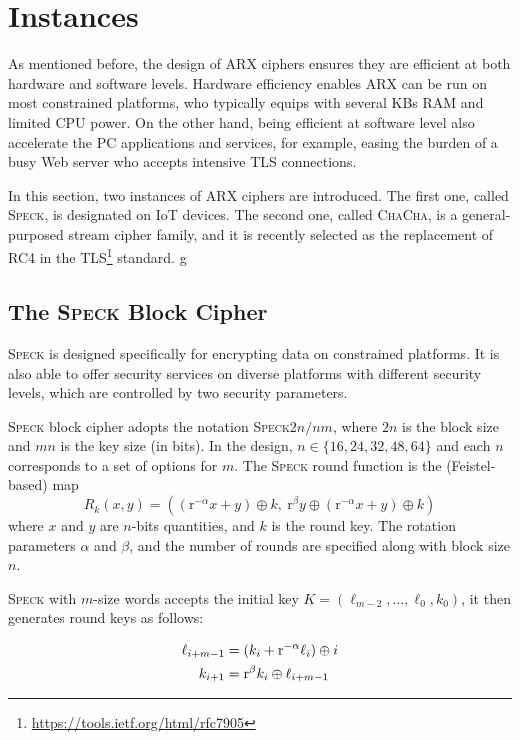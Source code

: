 \section{Instances}
\label{sec:instances}

As mentioned before, the design of ARX ciphers ensures they are efficient at both
hardware and software levels. Hardware efficiency enables ARX can be run on most
constrained platforms, who typically equips with several KBs RAM and limited CPU power.
On the other hand, being efficient at software level also accelerate the PC applications
and services, for example, easing the burden of a busy Web server who accepts intensive
TLS connections.

In this section, two instances of ARX ciphers are introduced. The first one, called
\textsc{Speck}\cite{beaulieu2015simon2}, is designated on IoT devices. The second one,
called \textsc{ChaCha}\cite{bernstein2008chacha}, is a general-purposed stream cipher
family, and it is recently selected as the replacement of RC4 in the
TLS\footnote{\url{https://tools.ietf.org/html/rfc7905}} standard.
g
\subsection{The \textsc{\textbf{Speck}} Block Cipher}

\textsc{Speck} is designed specifically for encrypting data on constrained platforms.
It is also able to offer security services on diverse platforms with different security
levels, which are controlled by two security parameters.

\textsc{Speck} block cipher adopts the notation \textsc{Speck}$2n/nm$, where $2n$ is the
block size and $mn$ is the key size (in bits). In the design, $n\in\{16,24,32,48,64\}$
and each $n$ corresponds to a set of options for $m$. The \textsc{Speck} round function
is the (Feistel-based) map
$$R_k(x,y)=((\mathrm{r}^{-\alpha}x+y)\oplus k,\ \mathrm{r}^\beta y\oplus(\mathrm{r}^{-\alpha}x+y)\oplus k)$$
where $x$ and $y$ are $n$-bits quantities, and $k$ is the round key. The rotation
parameters $\alpha$ and $\beta$, and the number of rounds are specified along with
block size $n$.

\textsc{Speck} with $m$-size words accepts the initial key $K=(\ell_{m-2},\dots,\ell_0,k_0)$,
it then generates round keys as follows:

\begin{equation*}
\setlength{\abovedisplayshortskip}{0em}
\setlength{\abovedisplayskip}{0em}
\begin{split}
\ell_{i+m-1} &= (k_i+\mathrm{r}^{-\alpha}\ell_i)\oplus i\\
k_{i+1} &= \mathrm{r}^\beta k_i \oplus \ell_{i+m-1}
\end{split}
\end{equation*}

